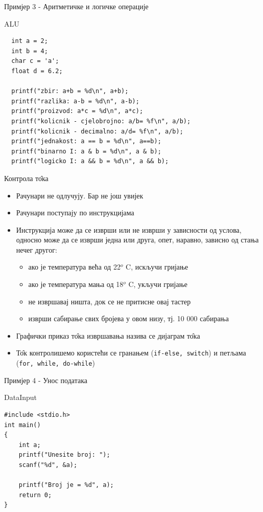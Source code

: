 \documentclass{beamer}
\begin{document}
\begin{frame}[fragile]{Примјер 3 - Аритметичке и логичке операције}
\begin{block}{ALU}
\begin{lstlisting}
  int a = 2;
  int b = 4;
  char c = 'a';
  float d = 6.2;

  printf("zbir: a+b = %d\n", a+b);
  printf("razlika: a-b = %d\n", a-b);
  printf("proizvod: a*c = %d\n", a*c);
  printf("kolicnik - cjelobrojno: a/b= %f\n", a/b);
  printf("kolicnik - decimalno: a/d= %f\n", a/b);
  printf("jednakost: a == b = %d\n", a==b);
  printf("binarno I: a & b = %d\n", a & b);
  printf("logicko I: a && b = %d\n", a && b);
\end{lstlisting}
\end{block}
\end{frame}

\begin{frame}{Контрола т\^{о}ка}
\begin{itemize}
    \item Рачунари не одлучују. Бар не још увијек
    \item Рачунари поступају по инструкцијама
    \item Инструкција може да се изврши или не изврши у зависности од услова, односно може да се изврши једна или друга, опет, наравно, зависно од стања нечег другог:
    \begin{itemize}
        \item ако је температура већа од 22$^o$ C, искључи гријање
        \item ако је температура мања од 18$^o$ C, укључи гријање
        \item не извршавај ништа, док се не притисне овај тастер
        \item изврши сабирање свих бројева у овом низу, тј. 10 000 сабирања
    \end{itemize}
    \item Графички приказ т\^{о}ка извршавања назива се дијаграм т\^{о}ка
    \item Т\^{о}к контролишемо користећи се гранањем (\texttt{if-else, switch}) и петљама (\texttt{for, while, do-while})
\end{itemize}
\end{frame}

\begin{frame}[fragile]{Примјер 4 - Унос података}
\begin{block}{DataInput}
\begin{lstlisting}
#include <stdio.h>
int main()
{
    int a;
    printf("Unesite broj: ");
    scanf("%d", &a);  
    
    printf("Broj je = %d", a);
    return 0;
}
\end{lstlisting}
\end{block}
\end{frame}
\end{document}
